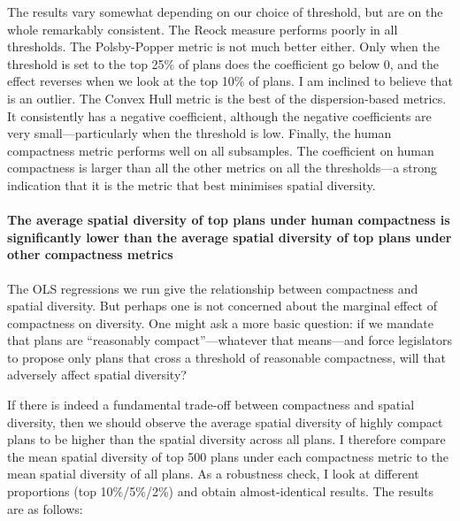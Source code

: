 \documentclass[]{article}
\let\oldparagraph\paragraph
\renewcommand{\paragraph}[1]{\oldparagraph{#1}\mbox{}}
\begin{document}
The results vary somewhat depending on our choice of threshold, but are
on the whole remarkably consistent. The Reock measure performs poorly in
all thresholds. The Polsby-Popper metric is not much better either. Only
when the threshold is set to the top 25\% of plans does the coefficient
go below 0, and the effect reverses when we look at the top 10\% of
plans. I am inclined to believe that is an outlier. The Convex Hull
metric is the best of the dispersion-based metrics. It consistently has
a negative coefficient, although the negative coefficients are very
small---particularly when the threshold is low. Finally, the human
compactness metric performs well on all subsamples. The coefficient on
human compactness is larger than all the other metrics on all the
thresholds---a strong indication that it is the metric that best
minimises spatial diversity.

\hypertarget{the-average-spatial-diversity-of-top-plans-under-human-compactness-is-significantly-lower-than-the-average-spatial-diversity-of-top-plans-under-other-compactness-metrics}{%
\paragraph{The average spatial diversity of top plans under human
compactness is significantly lower than the average spatial diversity of
top plans under other compactness
metrics}\label{the-average-spatial-diversity-of-top-plans-under-human-compactness-is-significantly-lower-than-the-average-spatial-diversity-of-top-plans-under-other-compactness-metrics}}

The OLS regressions we run give the relationship between compactness and
spatial diversity. But perhaps one is not concerned about the marginal
effect of compactness on diversity. One might ask a more basic question:
if we mandate that plans are ``reasonably compact''---whatever that
means---and force legislators to propose only plans that cross a
threshold of reasonable compactness, will that adversely affect spatial
diversity?

If there is indeed a fundamental trade-off between compactness and
spatial diversity, then we should observe the average spatial diversity
of highly compact plans to be higher than the spatial diversity across
all plans. I therefore compare the mean spatial diversity of top 500
plans under each compactness metric to the mean spatial diversity of all
plans. As a robustness check, I look at different proportions (top
10\%/5\%/2\%) and obtain almost-identical results. The results are as
follows:
\end{document}
